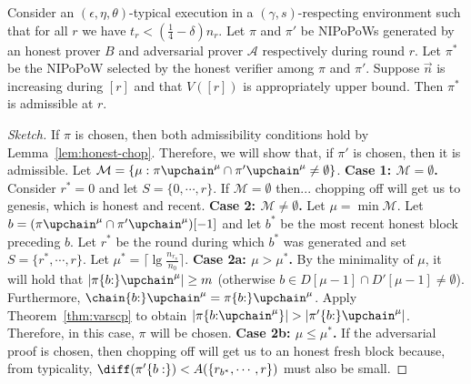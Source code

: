 \begin{theorem}\label{thm:admissibility}
  Consider an $(\epsilon, \eta, \theta)$-typical execution in a
  $(\gamma, s)$-respecting environment such that for all $r$ we have
  $t_r < (\frac{1}{4} - \delta)n_r$.
  Let $\pi$ and $\pi'$ be NIPoPoWs generated by an honest prover $B$
  and adversarial prover $\mathcal{A}$ respectively during round $r$. Let
  $\pi^*$ be the NIPoPoW selected by the honest verifier among $\pi$
  and $\pi'$. Suppose $\vec{n}$ is increasing during $[r]$ and
  that $V([r])$ is appropriately upper bound.
  Then $\pi^*$ is admissible at $r$.
\end{theorem}
\begin{proof}[Sketch]
  If $\pi$ is chosen, then both admissibility conditions hold by
  Lemma~\ref{lem:honest-chop}.
  Therefore, we will show that, if $\pi'$ is chosen, then it is admissible.
  Let $\mathcal{M} =
  \{\mu: \pi\upchain^\mu \cap \pi'\upchain^\mu \neq \emptyset\}$.
  \textbf{Case 1: $\mathcal{M} = \emptyset$.}
  Consider $r^* = 0$ and let $S = \{0, \cdots, r\}$.
  If $\mathcal{M} = \emptyset$ then... chopping off will get us to genesis,
  which is honest and recent. 
  \textbf{Case 2: $\mathcal{M} \neq \emptyset$.}
  Let
  $\mu = \min\mathcal{M}$. Let
  $b = (\pi\upchain^\mu \cap \pi'\upchain^\mu)[-1]$
  and let $b^*$ be the most recent honest block preceding $b$.
  Let $r^*$ be the round during which $b^*$ was generated
  and set $S = \{r^*, \cdots, r\}$.
  Let $\mu^* = \lceil\lg\frac{n_{r_\pi}}{n_0}\rceil$.
  \textbf{Case 2a: $\mu > \mu^*$.}
  By the minimality of $\mu$, it will hold that
  $|\pi\{b{:}\}\upchain^\mu| \geq m$ (otherwise
  $b \in D[\mu - 1] \cap D'[\mu - 1] \neq \emptyset$).
  Furthermore, $\chain\{b{:}\}\upchain^\mu = \pi\{b{:}\}\upchain^\mu$.
  Apply Theorem~\ref{thm:varscp} to obtain
  $|\pi\{b{:}\upchain^\mu\}| > |\pi'\{b{:}\}\upchain^\mu|$.
  Therefore, in this case, $\pi$ will be chosen.
  \textbf{Case 2b: $\mu \leq \mu^*$.}
  If the adversarial proof is chosen, then chopping off will get us to an
  honest fresh block because, from typicality,
  $\diff(\pi'\{b:\}) < A(\{r_{b^*}, \cdots, r\})$ must also be small.
\end{proof}


